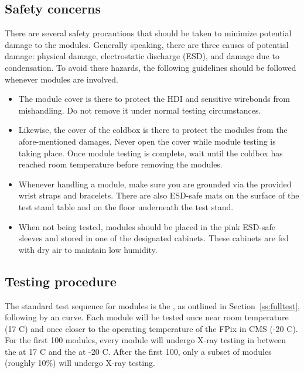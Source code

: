 \subsection{Safety concerns}
\label{ss:safety}

There are several safety procautions that should be taken to minimize potential damage to the modules.
Generally speaking, there are three causes of potential damage: 
physical damage, electrostatic discharge (ESD), and damage due to condensation.
To avoid these hazards, the following guidelines should be followed whenever modules are involved.
\begin{itemize}
\item The module cover is there to protect the HDI and sensitive wirebonds from mishandling.
Do not remove it under normal testing circumstances.
\item Likewise, the cover of the coldbox is there to protect the modules from the afore-mentioned damages.  
Never open the cover while module testing is taking place.  
Once module testing is complete, wait until the coldbox has reached room temperature before removing the modules.
\item Whenever handling a module, make sure you are grounded via the provided wrist straps and bracelets.
There are also ESD-safe mats on the surface of the test stand table and on the floor underneath the test stand.
\item When not being tested, modules should be placed in the pink ESD-safe sleeves and stored in one of the designated cabinets.
These cabinets are fed with dry air to maintain low humidity.
\end{itemize}

\subsection{Testing procedure}
\label{ss:procedure}

The standard test sequence for modules is the \fulltest, as outlined in Section~\ref{ss:fulltest}, following by an \iv curve.
Each module will be tested once near room temperature (17 C) 
and once closer to the operating temperature of the FPix in CMS (-20 C).
For the first 100 modules, every module will undergo X-ray testing in between the \fulltest at 17 C and the \fulltest at -20 C.
After the first 100, only a subset of modules (roughly 10\%) will undergo X-ray testing.

